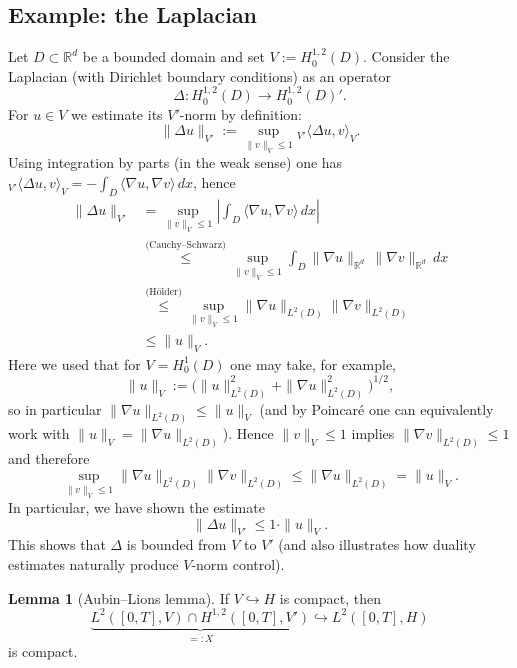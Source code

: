 \documentclass[11pt]{article}
\theoremstyle{definition}
\newtheorem{lemma}{Lemma}
\theoremstyle{remark}
\newcommand{\dual}[2]{{}_{V'}\langle #1, #2 \rangle_{V}}
\begin{document}
\subsection*{Example: the Laplacian}
Let $D\subset\mathbb{R}^{d}$ be a bounded domain and set $V:=H_{0}^{1,2}(D)$.
Consider the Laplacian (with Dirichlet boundary conditions) as an operator
\[
\Delta: H_{0}^{1,2}(D)\to H_{0}^{1,2}(D)'.
\]
For $u\in V$ we estimate its $V'$-norm by definition:
\[
\|\Delta u\|_{V'}
:=\sup_{\|v\|_{V}\le 1}\dual{\Delta u}{v}.
\]
Using integration by parts (in the weak sense) one has $\dual{\Delta u}{v}=-\int_{D}\langle\nabla u,\nabla v\rangle\,dx$, hence
\[
\begin{aligned}
\|\Delta u\|_{V'}
&=\sup_{\|v\|_{V}\le 1}\left|\int_{D}\langle\nabla u,\nabla v\rangle\,dx\right|\\
&\overset{\text{(Cauchy--Schwarz)}}{\le} \sup_{\|v\|_{V}\le 1}\int_D \|\nabla u\|_{\mathbb{R}^{d}}\,\|\nabla v\|_{\mathbb{R}^{d}}\,dx\\
&\overset{\text{(H\"older)}}{\le} \sup_{\|v\|_{V}\le 1}\|\nabla u\|_{L^{2}(D)}\|\nabla v\|_{L^{2}(D)}\\
&\le \|u\|_{V}.
\end{aligned}
\]
Here we used that for \(V=H_0^{1}(D)\) one may take, for example,
\[
\|u\|_{V}:=\Big(\|u\|_{L^{2}(D)}^{2}+\|\nabla u\|_{L^{2}(D)}^{2}\Big)^{1/2},
\]
so in particular \(\|\nabla u\|_{L^{2}(D)}\le \|u\|_{V}\) (and by Poincar\'e one can equivalently work with \(\|u\|_{V}=\|\nabla u\|_{L^{2}(D)}\)). Hence \(\|v\|_{V}\le 1\) implies \(\|\nabla v\|_{L^{2}(D)}\le 1\) and therefore
\[
\sup_{\|v\|_{V}\le 1}\|\nabla u\|_{L^{2}(D)}\|\nabla v\|_{L^{2}(D)}\le \|\nabla u\|_{L^{2}(D)}=\|u\|_{V}.
\]
In particular, we have shown the estimate
\[
\|\Delta u\|_{V'}\le 1\cdot \|u\|_{V}.
\]
This shows that $\Delta$ is bounded from $V$ to $V'$ (and also illustrates how duality estimates naturally produce $V$-norm control).

\begin{lemma}[Aubin--Lions lemma]
If \(V\hookrightarrow H\) is compact, then
\[
\underbrace{L^{2}([0,T],V)\cap H^{1,2}([0,T],V')}_{=:X}\hookrightarrow L^{2}([0,T],H)
\]
is compact.
\end{lemma}
\end{document}
